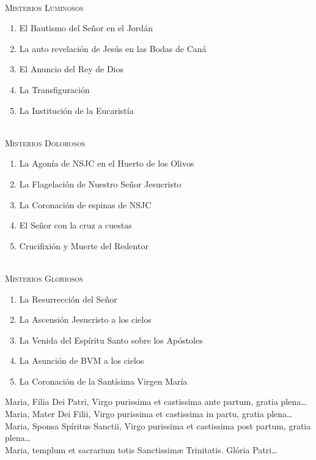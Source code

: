 \documentclass[9pt]{article}
\begin{document}
\begin{multicols*}{2}
    \small{}\\
    \textsc{Misterios Luminosos}
    \begin{enumerate}
        \item El Bautismo del Señor en el Jordán
        \item La auto revelación de Jesús en las Bodas de Caná
        \item El Anuncio del Rey de Dios
        \item La Transfiguración
        \item La Institución de la Eucaristía
    \end{enumerate}

    \small{}\\
    \textsc{Misterios Dolorosos}
    \begin{enumerate}
        \item La Agonía de NSJC en el Huerto de los Olivos
        \item La Flagelación de Nuestro Señor Jesucristo
        \item La Coronación de espinas de NSJC
        \item El Señor con la cruz a cuestas
        \item Crucifixión y Muerte del Redentor
    \end{enumerate}

    \small{}\\
    \textsc{Misterios Gloriosos}
    \begin{enumerate}
        \item La Resurrección del Señor
        \item La Ascensión Jesucristo a los cielos
        \item La Venida del Espíritu Santo sobre los Apóstoles
        \item La Asunción de BVM a los cielos
        \item La Coronación de la Santísima Virgen María
    \end{enumerate}

    \bigskip

     Maria, Filia Dei Patri, Virgo purissima et castissima ante partum, gratia plena{\ldots}\\
     Maria, Mater Dei Filii, Virgo purissima et castissima in partu, gratia plena{\ldots}\\
     Maria, Sponsa Spíritus Sanctii, Virgo purissima et castissima post partum, gratia plena{\ldots}\\
     Maria, templum et sacrarium totis Sanctissim{\ae} Trinitatis. Glória Patri{\ldots}\\


\end{multicols*}
\end{document}
